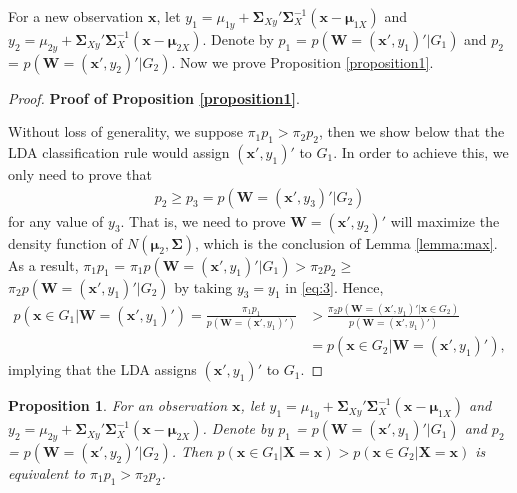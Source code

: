 \documentclass[12pt]{article}
\newtheorem{proposition}{Proposition}%
\begin{document}
For a new observation $\bm x$, let $y_1 = \mu_{1y} + \bm \Sigma_{Xy}' \bm \Sigma_{X}^{-1} (\bm x - \bm \mu_{1X})$ and $y_2 = \mu_{2y} + \bm \Sigma_{Xy}' \bm \Sigma_{X}^{-1} (\bm x - \bm \mu_{2X})$.
Denote by $p_1$ = $p(\bm W = (\bm x', y_1)' | G_1)$
and $p_2$ = $p(\bm W = (\bm x', y_2)' | G_2)$.
Now we prove Proposition \ref{proposition1}.
\begin{proof}{\textbf{Proof of Proposition \ref{proposition1}}.}{}

Without loss of generality, we suppose $\pi_1 p_1 >\pi_2 p_2$, then we show below that the LDA classification rule would assign $(\bm x', y_1)'$ to $G_1$.
In order to achieve this,
we only need to prove that
\begin{align}\label{eq:3}
p_2 \geq p_3 =  p(\bm W = (\bm x', y_3)' | G_2)
\end{align}
for any value of $y_3$.
That is, we need to prove $\bm W = (\bm x', y_2)'$ will maximize
the density function of $N(\bm \mu_2, \bm \Sigma)$, which is the conclusion of Lemma \ref{lemma:max}.
As a result, $\pi_1 p_1$ = $\pi_1 p(\bm W = (\bm x', y_1)' | G_1) > \pi_2 p_2 \geq$ $\pi_2 p(\bm W = (\bm x', y_1)' | G_2)$ by taking $y_3 = y_1$ in \eqref{eq:3}.
Hence,
\begin{align*}
p(\bm x \in G_1 | \bm W = (\bm x', y_1)') = \frac{\pi_1 p_1}{p(\bm W = (\bm x', y_1)')} &> \frac{\pi_2 p(\bm W = (\bm x', y_1)' | \bm x \in G_2)}{p(\bm W = (\bm x', y_1)')} \\
&= p(\bm x \in G_2 | \bm W = (\bm x', y_1)'),
\end{align*}
implying that the LDA assigns $(\bm x', y_1)'$ to $G_1$.
\end{proof}

\begin{proposition}{}{\label{proposition2}}
For an observation $\bm x$, let $y_1 = \mu_{1y} + \bm \Sigma_{Xy}' \bm \Sigma_{X}^{-1} (\bm x - \bm \mu_{1X})$ and $y_2 = \mu_{2y} + \bm \Sigma_{Xy}' \bm \Sigma_{X}^{-1} (\bm x - \bm \mu_{2X})$.
Denote by $p_1$ = $p(\bm W = (\bm x', y_1)' | G_1)$ and $p_2$ = $p(\bm W = (\bm x', y_2)' | G_2)$.
Then $p(\bm x \in G_1 | \bm X = \bm x) > p(\bm x \in G_2 | \bm X = \bm x)$ is equivalent to $\pi_1 p_1 >\pi_2 p_2$.
\end{proposition}
\end{document}
